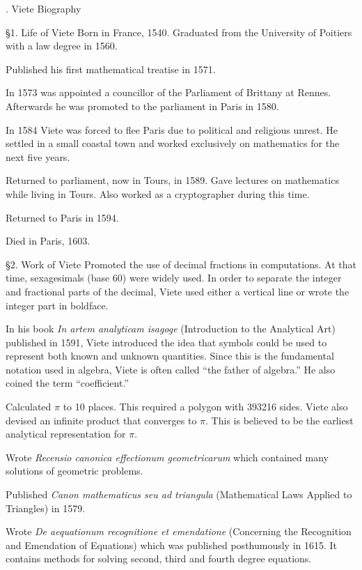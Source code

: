 . Viete Biography

\bigskip
\item{\S1.} Life of Viete
 Born in France, 1540.
Graduated from the University of Poitiers with a
law degree in 1560.

Published his first mathematical treatise in 1571.

In 1573 was appointed a councillor of the
Parliament of Brittany at Rennes. Afterwards he was
promoted to the parliament in Paris in 1580.

In 1584 Viete was forced to flee Paris due to
political and religious unrest.
He settled in a small coastal town and worked
exclusively on mathematics for the next
five years.

Returned to parliament, now in Tours, in 1589.
Gave lectures on mathematics while living in Tours.
Also worked as a cryptographer during this time.

Returned to Paris in 1594.

 Died in Paris, 1603.

\bigskip
\item{\S2.} Work of Viete
Promoted the use of decimal fractions in computations.
At that time, sexagesimals (base 60) were widely used.
In order to separate the integer and fractional parts
of the decimal, Viete used either a vertical line or
wrote the integer part in boldface.

In his book {\it In artem analyticam isagoge}
(Introduction to the Analytical Art) published in 1591,
Viete introduced the idea that symbols could be
used to represent both known and unknown quantities.
Since this is the fundamental notation used in algebra,
Viete is often called ``the
father of algebra.''
He also coined the term ``coefficient.''

Calculated $\pi$ to 10 places.
This required a polygon with 393216 sides.
Viete also devised an infinite product that converges to $\pi$.
This is believed to be the earliest analytical representation
for $\pi$.

Wrote {\it Recensio canonica effectionum geometricarum}
which contained many solutions of geometric problems.

Published {\it  Canon mathematicus seu ad triangula}
(Mathematical Laws Applied to Triangles) in 1579.

Wrote {\it De aequationum recognitione et emendatione}
(Concerning the Recognition and Emendation of Equations)
which was published posthumously in 1615.
It contains methods for solving second,
third and fourth degree equations.

